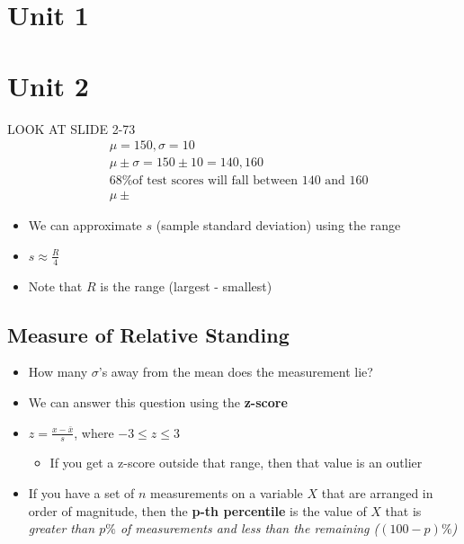 \documentclass{package/notes}
\renewcommand{\bf}[1]{\textbf{#1}}
\renewcommand{\it}[1]{\textit{#1}}
\begin{document}
\chapter{Unit 1}



\chapter{Unit 2}


\begin{problem}
	LOOK AT SLIDE 2-73\\

	\begin{equation*}
		\begin{aligned}
			&\mu = 150, \sigma = 10\\	
			&\mu \pm \sigma = 150 \pm 10 = 140,160\\
			&\text{68\% of test scores will fall between 140 and 160}\\
			&\mu \pm %
		\end{aligned}
	\end{equation*}
\end{problem}

\begin{itemize}
	\item We can approximate $s$ (sample standard deviation) using the range
	\item $s \approx \frac{R}{4}$
	\item Note that $R$ is the range (largest - smallest)
\end{itemize}

\section{Measure of Relative Standing}

\begin{itemize}
	\item How many $\sigma$'s away from the mean does the measurement lie?
	\item We can answer this question using the \bf{z-score}
	\item $z = \frac{x - \bar{x}}{s}$, where $-3 \le z \le 3$
	\begin{itemize}
		\item If you get a z-score outside that range, then that value is an outlier
	\end{itemize}
	\item If you have a set of $n$ measurements on a variable $X$ that are arranged in order of magnitude, then the \bf{p-th percentile} is the value of $X$ that is \it{greater than $p\%$ of measurements and less than the remaining ($(100-p)\%$)}
\end{itemize}
\end{document}
